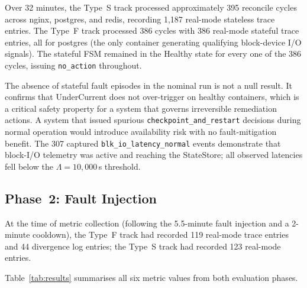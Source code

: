\documentclass[runningheads]{llncs}
\begin{document}
Over 32 minutes, the Type~S track processed approximately 395 reconcile
cycles across nginx, postgres, and redis, recording 1{,}187 real-mode
stateless trace entries. The Type~F track processed 386 cycles with 386
real-mode stateful trace entries, all for postgres (the only container
generating qualifying block-device I/O signals). The stateful FSM
remained in the Healthy state for every one of the 386 cycles, issuing
\texttt{no\_action} throughout.

The absence of stateful fault episodes in the nominal run is not a null
result. It confirms that UnderCurrent does not over-trigger on healthy
containers, which is a critical safety property for a system that
governs irreversible remediation actions. A system that issued spurious
\texttt{checkpoint\_and\_restart} decisions during normal operation
would introduce availability risk with no fault-mitigation benefit.
The 307 captured \texttt{blk\_io\_latency\_normal} events demonstrate
that block-I/O telemetry was active and reaching the StateStore;
all observed latencies fell below the $\Lambda = 10{,}000$\,\textmu s
threshold.

\subsection{Phase~2: Fault Injection}

At the time of metric collection (following the 5.5-minute fault
injection and a 2-minute cooldown), the Type~F track had recorded 119
real-mode trace entries and 44 divergence log entries; the Type~S track
had recorded 123 real-mode entries.

Table~\ref{tab:results} summarises all six metric values from both
evaluation phases.
\end{document}
